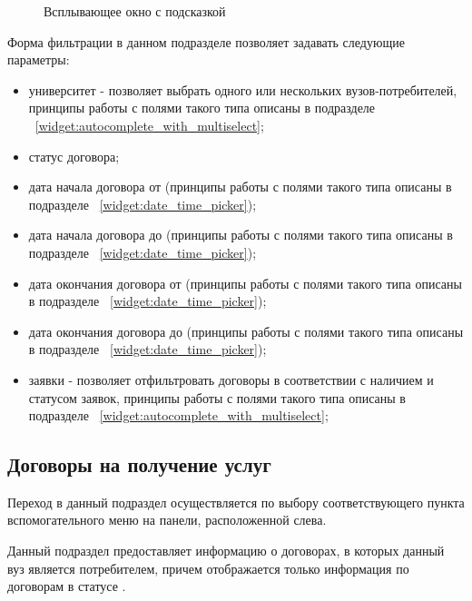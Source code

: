\begin{figure}[H]
\caption{Всплывающее окно с подсказкой}
\label{agreement:table_help_legend}
\end{figure}	

Форма фильтрации в данном подразделе позволяет задавать следующие параметры:
\begin{itemize}
	\item университет - позволяет выбрать одного или нескольких вузов-потребителей, принципы работы с полями такого типа описаны в подразделе ~\ref{widget:autocomplete_with_multiselect};
	\item статус договора;
	\item дата начала договора от (принципы работы с полями такого типа описаны в подразделе ~\ref{widget:date_time_picker});
	\item дата начала договора до (принципы работы с полями такого типа описаны в подразделе ~\ref{widget:date_time_picker});
	\item дата окончания договора от (принципы работы с полями такого типа описаны в подразделе ~\ref{widget:date_time_picker});
	\item дата окончания договора до (принципы работы с полями такого типа описаны в подразделе ~\ref{widget:date_time_picker});
	\item заявки - позволяет отфильтровать договоры в соответствии с наличием и статусом заявок, принципы работы с полями такого типа описаны в подразделе ~\ref{widget:autocomplete_with_multiselect};
\end{itemize}

\subsection{Договоры на получение услуг}
Переход в данный подраздел осуществляется по выбору соответствующего пункта вспомогательного меню на панели, расположенной слева.

Данный подраздел предоставляет информацию о договорах, в которых данный вуз является потребителем, причем отображается только информация по договорам в статусе .

